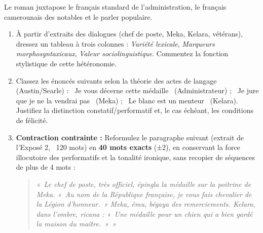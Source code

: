 \documentclass[11pt]{article}
\begin{document}
\begin{exercice}
Le roman juxtapose le français standard de l’administration, le français camerounais des notables et le parler populaire.
\begin{enumerate}
    \item À partir d’extraits des dialogues (chef de poste, Meka, Kelara, vétérans), dressez un tableau à trois colonnes : \textit{Variété lexicale}, \textit{Marqueurs morphosyntaxicaux}, \textit{Valeur sociolinguistique}. Commentez la fonction stylistique de cette hétéronomie.
    \item Classez les énoncés suivants selon la théorie des actes de langage (Austin/Searle) : \og~Je vous décerne cette médaille~ \fg{} (Administrateur) ; \og~Je jure que je ne la vendrai pas~ \fg{} (Meka) ; \og~Le blanc est un menteur~ \fg{} (Kelara). Justifiez la distinction constatif/performatif et, le cas échéant, les conditions de félicité.
    \item \textbf{Contraction contrainte :} Reformulez le paragraphe suivant (extrait de l’Exposé 2, ~120 mots) en \textbf{40 mots exacts} (±2), en conservant la force illocutoire des performatifs et la tonalité ironique, sans recopier de séquences de plus de 4 mots :
    \begin{quote}
    \textit{«~Le chef de poste, très officiel, épingla la médaille sur la poitrine de Meka. «~Au nom de la République française, je vous fais chevalier de la Légion d’honneur.~» Meka, ému, bégaya des remerciements. Kelara, dans l’ombre, ricana : «~Une médaille pour un chien qui a bien gardé la maison du maître.~»~»}
    \end{quote}
\end{enumerate}
\end{exercice}
\end{document}
